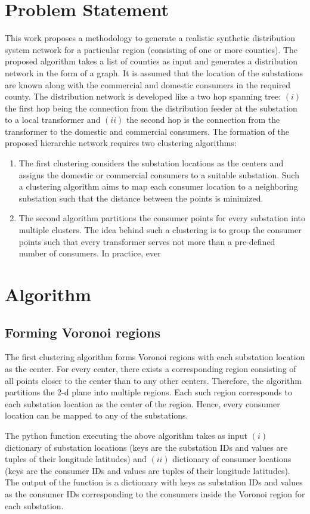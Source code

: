 \documentclass[12pt]{amsart}
\theoremstyle{definition}
\theoremstyle{remark} \newtheorem{remark}[theorem]{Remark} %
\numberwithin{equation}{section} %
\begin{document}
	\thispagestyle{fancy} \phantom{}
	
	\section{Problem Statement}
	This work proposes a methodology to generate a realistic synthetic distribution system network for a particular region (consisting of one or more counties). The proposed algorithm takes a list of counties as input and generates a distribution network in the form of a graph. It is assumed that the location of the substations are known along with the commercial and domestic consumers in the required county. The distribution network is developed like a two hop spanning tree: $(i)$ the first hop being the connection from the distribution feeder at the substation to a local transformer and $(ii)$ the second hop is the connection from the transformer to the domestic and commercial consumers. The formation of the proposed hierarchic network requires two clustering algorithms:
	\begin{enumerate}
		\item The first clustering considers the substation locations as the centers and assigns the domestic or commercial consumers to a suitable substation. Such a clustering algorithm aims to map each consumer location to a neighboring substation such that the distance between the points is minimized.
		\item The second algorithm partitions the consumer points for every substation into multiple clusters. The idea behind such a clustering is to group the consumer points such that every transformer serves not more than a pre-defined number of consumers. In practice, ever
	\end{enumerate}
	
	\section{Algorithm}
	\subsection{Forming Voronoi regions}
	The first clustering algorithm forms Voronoi regions with each substation location as the center. For every center, there exists a corresponding region consisting of all points closer to the center than to any other centers. Therefore, the algorithm partitions the 2-d plane into multiple regions. Each such region corresponds to each substation location as the center of the region. Hence, every consumer location can be mapped to any of the substations.
	\par
	The python function executing the above algorithm takes as input $(i)$ dictionary of substation locations (keys are the substation IDs and values are tuples of their longitude latitudes) and $(ii)$ dictionary of consumer locations (keys are the consumer IDs and values are tuples of their longitude latitudes). The output of the function is a dictionary with keys as substation IDs and values as the consumer IDs corresponding to the consumers inside the Voronoi region for each substation.
\end{document}
